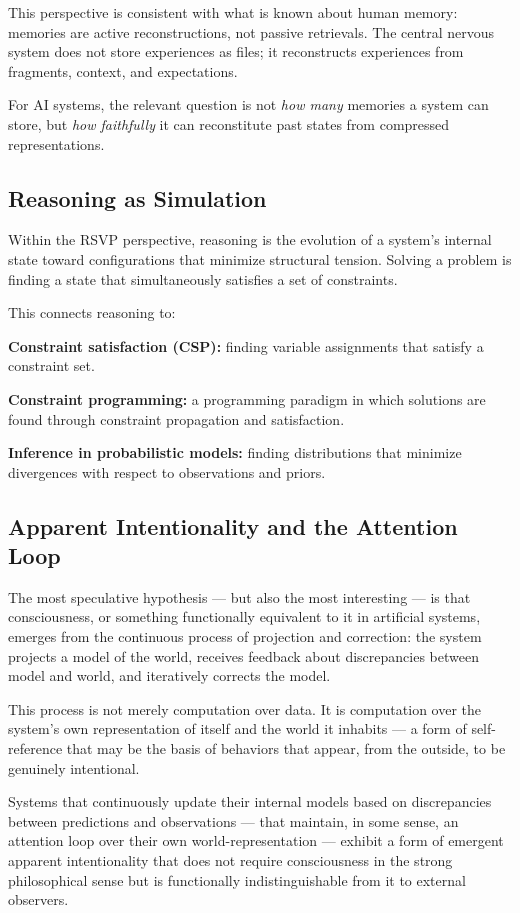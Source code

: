\documentclass[11pt, a4paper]{article}
\theoremstyle{named}
\begin{document}
This perspective is consistent with what is known about human memory:
memories are active reconstructions, not passive retrievals. The
central nervous system does not store experiences as files; it
reconstructs experiences from fragments, context, and expectations.

For AI systems, the relevant question is not \emph{how many} memories
a system can store, but \emph{how faithfully} it can reconstitute
past states from compressed representations.

\subsection{Reasoning as Simulation}

Within the RSVP perspective, reasoning is the evolution of a system's
internal state toward configurations that minimize structural tension.
Solving a problem is finding a state that simultaneously satisfies
a set of constraints.

This connects reasoning to:

\textbf{Constraint satisfaction (CSP):} finding variable assignments
that satisfy a constraint set.

\textbf{Constraint programming:} a programming paradigm in which
solutions are found through constraint propagation and satisfaction.

\textbf{Inference in probabilistic models:} finding distributions
that minimize divergences with respect to observations and priors.

\subsection{Apparent Intentionality and the Attention Loop}

The most speculative hypothesis --- but also the most interesting ---
is that consciousness, or something functionally equivalent to it in
artificial systems, emerges from the continuous process of projection
and correction: the system projects a model of the world, receives
feedback about discrepancies between model and world, and iteratively
corrects the model.

This process is not merely computation over data. It is computation
over the system's own representation of itself and the world it
inhabits --- a form of self-reference that may be the basis of
behaviors that appear, from the outside, to be genuinely intentional.

\begin{keybox}
Systems that continuously update their internal models based on
discrepancies between predictions and observations --- that maintain,
in some sense, an attention loop over their own world-representation
--- exhibit a form of emergent apparent intentionality that does not
require consciousness in the strong philosophical sense but is
functionally indistinguishable from it to external observers.
\end{keybox}
\end{document}
